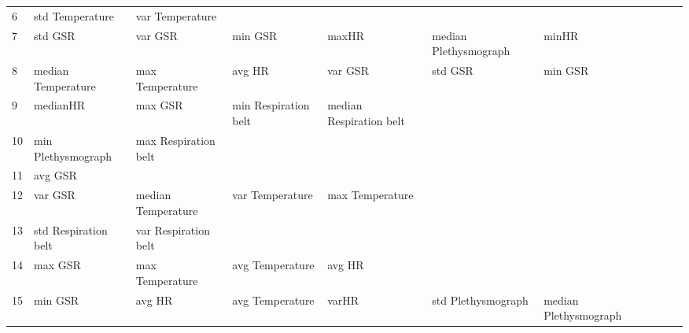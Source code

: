 \begin{landscape}
\begin{table}[]
\begin{tabular}{l|llllllll}
6        & std Temperature         & var Temperature       &                         &                         &                         &                       &                      &          &                      &        \\
7        & std GSR                 & var GSR               & min GSR                 & maxHR                   & median Plethysmograph   & minHR                 &                      &          &                      &        \\
8        & median Temperature      & max Temperature       & avg HR                  & var GSR                 & std GSR                 & min GSR               &                      &          &                      &        \\
9        & medianHR                & max GSR               & min Respiration belt    & median Respiration belt &                         &                       &                      &          &                      &        \\
10       & min Plethysmograph      & max Respiration belt  &                         &                         &                         &                       &                      &          &                      &        \\
11       & avg GSR                 &                       &                         &                         &                         &                       &                      &          &                      &        \\
12       & var GSR                 & median Temperature    & var Temperature         & max Temperature         &                         &                       &                      &          &                      &        \\
13       & std Respiration belt    & var Respiration belt  &                         &                         &                         &                       &                      &          &                      &        \\
14       & max GSR                 & max Temperature       & avg Temperature         & avg HR                  &                         &                       &                      &          &                      &        \\
15       & min GSR                 & avg HR                & avg Temperature         & varHR                   & std Plethysmograph      & median Plethysmograph &                      &          &                      &        \\

\end{tabular}
\end{table}
\end{landscape}
